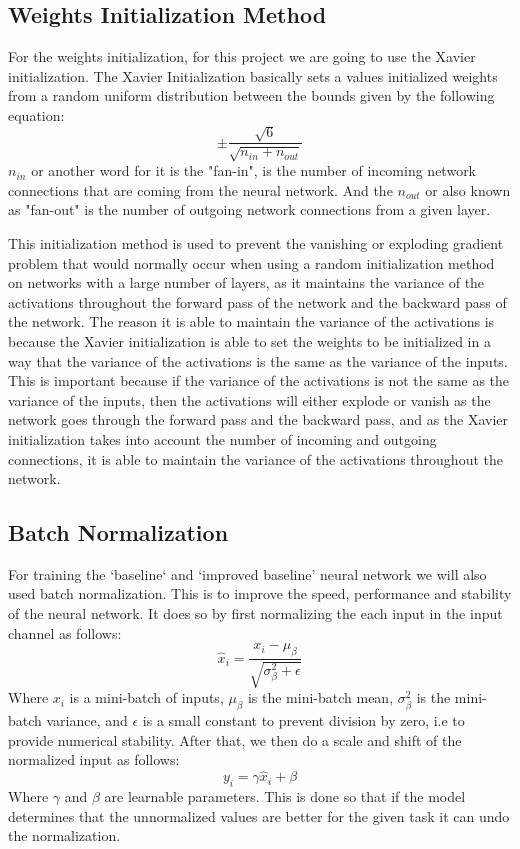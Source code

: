 \documentclass{article}
\begin{document}
\subsection{Weights Initialization Method}
For the weights initialization, for this project we are going to use the Xavier initialization. The Xavier Initialization basically sets a values initialized weights from a random uniform distribution between the bounds given by the following equation:
\begin{equation}
  \pm \frac{\sqrt{6}}{\sqrt{n_{in} + n_{out}}}
\end{equation}
$n_{in}$ or another word for it is the "fan-in", is the number of incoming network connections that are coming from the neural network. And the $n_{out}$ or also known as "fan-out" is the number of outgoing network connections from a given layer.

This initialization method is used to prevent the vanishing or exploding gradient problem that would normally occur when using a random initialization method on networks with a large number of layers, as it maintains the variance of the activations throughout the forward pass of the network and the backward pass of the network. The reason it is able to maintain the variance of the activations is because the Xavier initialization is able to set the weights to be initialized in a way that the variance of the activations is the same as the variance of the inputs. This is important because if the variance of the activations is not the same as the variance of the inputs, then the activations will either explode or vanish as the network goes through the forward pass and the backward pass, and as the Xavier initialization takes into account the number of incoming and outgoing connections, it is able to maintain the variance of the activations throughout the network.

\subsection{Batch Normalization}
For training the `baseline` and `improved baseline' neural network we will also used batch normalization. This is to improve the speed, performance and stability of the neural network. It does so by first normalizing the each input in the input channel as follows:
\begin{equation}
  \hat{x}_i = \frac{x_i - \mu_\beta}{\sqrt{\sigma^2_\beta + \epsilon}}
\end{equation}
Where $x_i$ is a mini-batch of inputs, $\mu_\beta$ is the mini-batch mean, $\sigma^2_\beta$ is the mini-batch variance, and $\epsilon$ is a small constant to prevent division by zero, i.e to provide numerical stability. After that, we then do a scale and shift of the normalized input as follows:
\begin{equation}
  y_i = \gamma \hat{x}_i + \beta
\end{equation}
Where $\gamma$ and $\beta$ are learnable parameters. This is done so that if the model determines that the unnormalized values are better for the given task it can undo the normalization.
\end{document}
